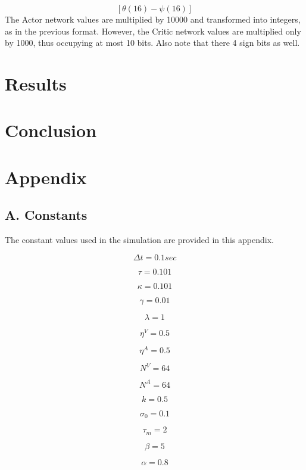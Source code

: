 \documentclass{article}
\begin{document}
\[
[\theta (16) - \psi (16)]
\]
The Actor network values are multiplied by 10000 and transformed into integers, as in the previous format. However, the Critic network values are multiplied only by 1000, thus occupying at most 10 bits. Also note that there 4 sign bits as well.


\section{Results}

\section{Conclusion}

\section{Appendix}
\subsection*{A. Constants}
The constant values used in the simulation are provided in this appendix.

\begin{multicols}{2}
\[ 
\Delta t = 0.1 sec
\]

\[
\tau = 0.101
\]

\[
\kappa = 0.101
\]

\[
\gamma = 0.01
\]

\[
\lambda = 1
\]

\[
\eta^{V} = 0.5
\]

\[
\eta^{A} = 0.5
\]

\[
N^{V} = 64
\]


\[
N^{A} = 64
\]

\[
k = 0.5
\]

\[
\sigma_{0} = 0.1
\]

\[
\tau_{m} = 2
\]

\[
\beta = 5
\]

\[ 
\alpha = 0.8
\]
\end{multicols}
\end{document}
